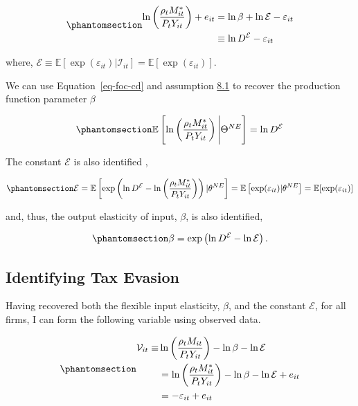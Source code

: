 \documentclass[
  12pt]{article}
\theoremstyle{definition}
\theoremstyle{remark}
\begin{document}
\begin{equation}\phantomsection\label{eq-foc-cd}{
\begin{aligned}
    \ln\left(\frac{\rho_t M^*_{it}}{P_{t}Y_{it}}\right)+e_{it}&=\ln\beta + \ln \mathcal{E}- \varepsilon_{it} \\
    &\equiv \ln D^{\mathcal{E}}- \varepsilon_{it} 
\end{aligned}
}\end{equation}

where,
\(\mathcal{E}\equiv \mathbb{E}[\exp(\varepsilon_{it})|\mathcal{I}_{it}]=\mathbb{E}[\exp(\varepsilon_{it})]\).

We can use Equation~\ref{eq-foc-cd} and assumption
\hyperref[ass-non-ev]{8.1} to recover the production function parameter
\(\beta\)

\begin{equation}\phantomsection\label{eq-foc-cd-exp}{
    \mathbb{E}\left[\ln\left(\frac{\rho_t M^*_{it}}{P_{t}Y_{it}}\right)\Bigg| \Theta^{NE}\right]=\ln D^{\mathcal{E}}
}\end{equation}

The constant \(\mathcal{E}\) is also identified \citep{Gandhi2020},

\begin{equation}\phantomsection\label{eq-id-E}{
\mathcal{E}=\mathbb{E}\left[\exp\left(\ln D^{\mathcal{E}}- \ln\left(\frac{\rho_t M^*_{it}}{P_{t}Y_{it}}\right)\right)|\theta^{NE}\right]=\mathbb{E}\left[\exp(\varepsilon_{it})|\theta^{NE}\right]=\mathbb{E}[\exp(\varepsilon_{it})]
}\end{equation}

and, thus, the output elasticity of input, \(\beta\), is also
identified,

\begin{equation}\phantomsection\label{eq-id-beta}{
\beta=\exp\left(\ln D^{\mathcal{E}}-\ln\mathcal{E}\right).
}\end{equation}

\subsection{Identifying Tax Evasion}\label{identifying-tax-evasion}

Having recovered both the flexible input elasticity, \(\beta\), and the
constant \(\mathcal{E}\), for all firms, I can form the following
variable using observed data.

\begin{equation}\phantomsection\label{eq-ob-ev}{
\begin{aligned}
    \mathcal V_{it}\equiv&\ln\left(\frac{\rho_t M_{it}}{P_{t}Y_{it}}\right)-\ln\beta -\ln\mathcal{E}\notag \\
    &=\ln\left(\frac{\rho_tM^*_{it}}{P_{t}Y_{it}}\right)-\ln\beta-\ln\mathcal{E}+e_{it} \notag \\
    &=-\varepsilon_{it} +e_{it}
\end{aligned}
}\end{equation}
\end{document}
